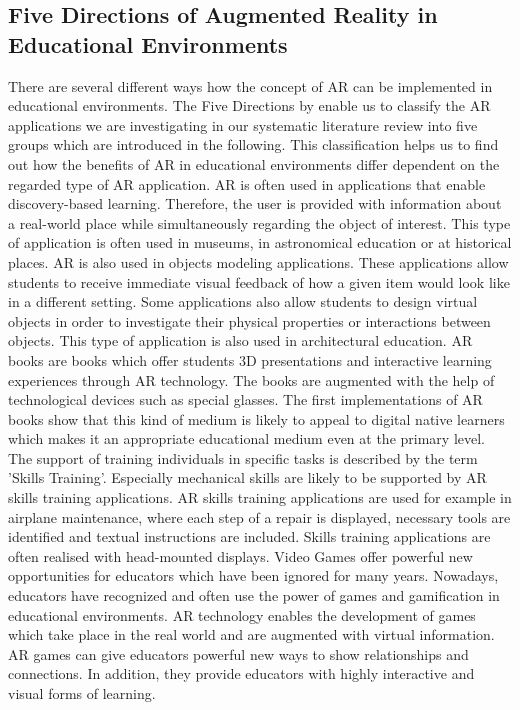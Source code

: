 \subsection{Five Directions of Augmented Reality in Educational Environments}
There are several different ways how the concept of AR can be implemented in educational environments. \autocite {Yuen.2011}\mulcit\autocite {Lee.2012} The Five Directions by \cite{Yuen.2011} enable us to classify the AR applications we are investigating in our systematic literature review into five groups which are introduced in the following. This classification helps us to find out how the benefits of AR in educational environments differ dependent on the regarded type of AR application.
AR is often used in applications that enable discovery-based learning. Therefore, the user is provided with information about a real-world place while simultaneously regarding the object of interest. This type of application is often used in museums, in astronomical education or at historical places.
AR is also used in objects modeling applications. These applications allow students to receive immediate visual feedback of how a given item would look like in a different setting. Some applications also allow students to design virtual objects in order to investigate their physical properties or interactions between objects. This type of application is also used in architectural education.
AR books are books which offer students 3D presentations and interactive learning experiences through AR technology. The books are augmented with the help of technological devices such as special glasses. The first implementations of AR books show that this kind of medium is likely to appeal to digital native learners which makes it an appropriate educational medium even at the primary level.
The support of training individuals in specific tasks is described by the term 'Skills Training'. Especially mechanical skills are likely to be supported by AR skills training applications. AR skills training applications are used for example in airplane maintenance, where each step of a repair is displayed, necessary tools are identified and textual instructions are included. Skills training applications are often realised with head-mounted displays. 
Video Games offer powerful new opportunities for educators which have been ignored for many years. \autocite{Squire.2003} Nowadays, educators have recognized and often use the power of games and gamification in educational environments. AR technology enables the development of games which take place in the real world and are augmented with virtual information. AR games can give educators powerful new ways to show relationships and connections. In addition, they provide educators with highly interactive and visual forms of learning.